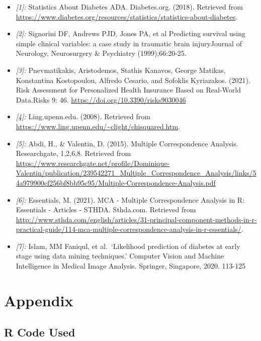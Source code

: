 \documentclass[
]{article}
\begin{document}
\begin{itemize}
\item
  \emph{{[}1{]}:} Statistics About Diabetes \textbar{} ADA.
  Diabetes.org. (2018). Retrieved from
  \url{https://www.diabetes.org/resources/statistics/statistics-about-diabetes}.
\item
  \emph{{[}2{]}:} Signorini DF, Andrews PJD, Jones PA, et al Predicting
  survival using simple clinical variables: a case study in traumatic
  brain injuryJournal of Neurology, Neurosurgery \& Psychiatry
  (1999);66:20-25.
\item
  \emph{{[}3{]}:} Pnevmatikakis, Aristodemos, Stathis Kanavos, George
  Matikas, Konstantina Kostopoulou, Alfredo Cesario, and Sofoklis
  Kyriazakos. (2021). Risk Assessment for Personalized Health Insurance
  Based on Real-World Data.Risks 9: 46.
  \url{https://doi.org/10.3390/risks9030046}
\item
  \emph{{[}4{]}:} Ling.upenn.edu. (2008). Retrieved from
  \url{https://www.ling.upenn.edu/~clight/chisquared.htm}.
\item
  \emph{{[}5{]}:} Abdi, H., \& Valentin, D. (2015). Multiple
  Correspondence Analysis. Researchgate, 1,2,6,8. Retrieved from
  \url{https://www.researchgate.net/profile/Dominique-Valentin/publication/239542271_Multiple_Correspondence_Analysis/links/54a979900cf256bf8bb95c95/Multiple-Correspondence-Analysis.pdf}
\item
  \emph{{[}6{]}:} Essentials, M. (2021). MCA - Multiple Correspondence
  Analysis in R: Essentials - Articles - STHDA. Sthda.com. Retrieved
  from
  \url{http://www.sthda.com/english/articles/31-principal-component-methods-in-r-practical-guide/114-mca-multiple-correspondence-analysis-in-r-essentials/}.
\item
  \emph{{[}7{]}:} Islam, MM Faniqul, et al.~`Likelihood prediction of
  diabetes at early stage using data mining techniques.' Computer Vision
  and Machine Intelligence in Medical Image Analysis. Springer,
  Singapore, 2020. 113-125
\end{itemize}

\hypertarget{appendix}{%
\section{Appendix}\label{appendix}}

\hypertarget{r-code-used}{%
\subsection{R Code Used}\label{r-code-used}}
\end{document}
